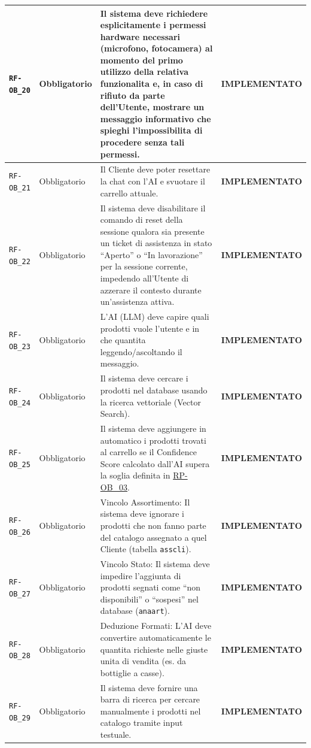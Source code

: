 \documentclass[a4paper, 11pt, oneside]{scrartcl}
\begin{document}
\begin{longtable}{|>{\raggedright\arraybackslash}p{}|>{\raggedright\arraybackslash}p{}|>{\raggedright\arraybackslash}p{}|>{\raggedright\arraybackslash}p{}|}
    \hline
    \texttt{RF-OB\_20} & Obbligatorio & Il sistema deve richiedere esplicitamente i permessi hardware necessari (microfono, fotocamera) al momento del primo utilizzo della relativa funzionalita e, in caso di rifiuto da parte dell'Utente, mostrare un messaggio informativo che spieghi l'impossibilita di procedere senza tali permessi. & \textbf{IMPLEMENTATO} \\
    \hline
    \texttt{RF-OB\_21} & Obbligatorio & Il Cliente deve poter resettare la chat con l'AI e svuotare il carrello attuale. & \textbf{IMPLEMENTATO} \\
    \hline
    \texttt{RF-OB\_22} & Obbligatorio & Il sistema deve disabilitare il comando di reset della sessione qualora sia presente un ticket di assistenza in stato ``Aperto'' o ``In lavorazione'' per la sessione corrente, impedendo all'Utente di azzerare il contesto durante un'assistenza attiva. & \textbf{IMPLEMENTATO} \\
    \hline
    \texttt{RF-OB\_23} & Obbligatorio & L'AI (LLM) deve capire quali prodotti vuole l'utente e in che quantita leggendo/ascoltando il messaggio. & \textbf{IMPLEMENTATO} \\
    \hline
    \texttt{RF-OB\_24} & Obbligatorio & Il sistema deve cercare i prodotti nel database usando la ricerca vettoriale (Vector Search). & \textbf{IMPLEMENTATO} \\
    \hline
    \texttt{RF-OB\_25} & Obbligatorio & Il sistema deve aggiungere in automatico i prodotti trovati al carrello se il Confidence Score calcolato dall'AI supera la soglia definita in \hyperlink{rp-ob_3}{RP-OB\_03}. & \textbf{IMPLEMENTATO} \\
    \hline
    \texttt{RF-OB\_26} & Obbligatorio & Vincolo Assortimento: Il sistema deve ignorare i prodotti che non fanno parte del catalogo assegnato a quel Cliente (tabella \texttt{asscli}). & \textbf{IMPLEMENTATO} \\
    \hline
    \texttt{RF-OB\_27} & Obbligatorio & Vincolo Stato: Il sistema deve impedire l'aggiunta di prodotti segnati come ``non disponibili'' o ``sospesi'' nel database (\texttt{anaart}). & \textbf{IMPLEMENTATO} \\
    \hline
    \texttt{RF-OB\_28} & Obbligatorio & Deduzione Formati: L'AI deve convertire automaticamente le quantita richieste nelle giuste unita di vendita (es. da bottiglie a casse). & \textbf{IMPLEMENTATO} \\
    \hline
    \texttt{RF-OB\_29} & Obbligatorio & Il sistema deve fornire una barra di ricerca per cercare manualmente i prodotti nel catalogo tramite input testuale. & \textbf{IMPLEMENTATO} \\

\end{longtable}
\end{document}
